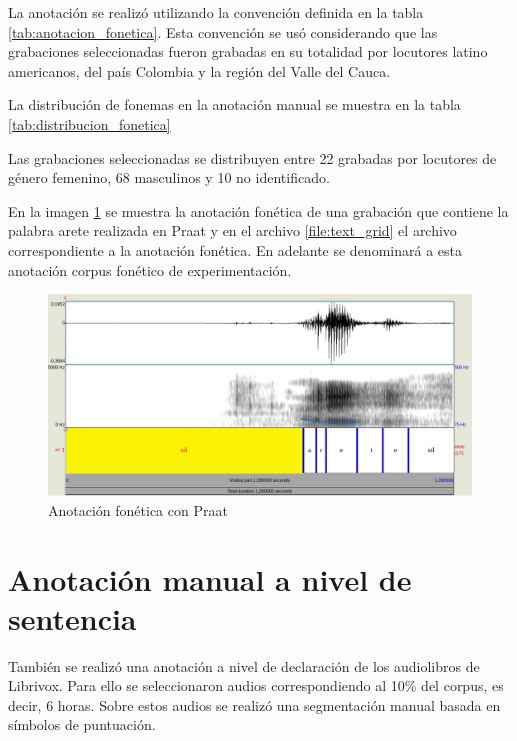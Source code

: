 La anotación se realizó utilizando la convención definida en la tabla \ref{tab:anotacion_fonetica}. Esta convención se us\'o considerando que las grabaciones seleccionadas fueron grabadas en su totalidad por locutores latino americanos, del país Colombia y la región del Valle del Cauca. 



La distribución de fonemas en la anotación manual se muestra en la tabla \ref{tab:distribucion_fonetica}



Las grabaciones seleccionadas se distribuyen entre 22 grabadas por locutores de género femenino, 68 masculinos y 10 no identificado.

En la imagen \ref{img:anotacion_fonetica_praat} se muestra la anotación fonética de una grabación que contiene la palabra arete realizada en Praat y en el archivo \ref{file:text_grid} el archivo correspondiente a la anotación fonética. En adelante se denominará a esta anotación corpus fonético de experimentación.


\begin{figure}[H]
\caption{Anotación fonética con Praat}
\label{img:anotacion_fonetica_praat}
\includegraphics[width=\textwidth]{imagenes/03_01_anotacion_fonetica.png}
\end{figure}





\section{Anotación manual a nivel de sentencia}

También se realizó una anotación a nivel de declaración de los audiolibros de Librivox. Para ello se seleccionaron audios correspondiendo al 10\% del corpus, es decir, 6 horas. Sobre estos audios se realizó una segmentación manual basada en símbolos de puntuación. 

